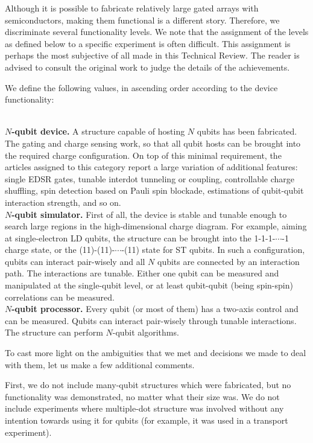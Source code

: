 \documentclass[aps, prx, showpacs, twocolumn, superscriptaddress, notitlepage, longbibliography, floatfix, nofootinbib]{revtex4-2}
\newcommand{\separate}[1]
{
 #1
}
\begin{document}
\label{sec:arrayFunctionality}

Although it is possible to fabricate relatively large gated arrays with semiconductors, making them functional is a different story. Therefore, we discriminate several functionality levels. We note that the assignment of the levels as defined below to a specific experiment is often difficult. This assignment is perhaps the most subjective of all made in this Technical Review. The reader is advised to consult the original work to judge the details of the achievements. 


We define the following values, in ascending order according to the device functionality:
\separate{
\textbf{\\$N$-qubit device.} A structure capable of hosting $N$ qubits has been fabricated. The gating and charge sensing work, so that all qubit hosts can be brought into the required charge configuration. On top of this minimal requirement, the articles assigned to this category report a large variation of additional features: single EDSR gates, tunable interdot tunneling or coupling, controllable charge shuffling, spin detection based on Pauli spin blockade, estimations of qubit-qubit interaction strength, and so on. 
\textbf{\\$N$-qubit simulator.} First of all, the device is stable and tunable enough to search large regions in the high-dimensional charge diagram. For example, aiming at single-electron LD qubits, the structure can be brought into the 1-1-1-$\cdots$-1 charge state, or the (11)-(11)-$\cdots$-(11) state for ST qubits. In such a configuration, qubits can interact pair-wisely and all $N$ qubits are connected by an interaction path. The interactions are tunable. Either one qubit can be measured and manipulated at the single-qubit level, or at least qubit-qubit (being spin-spin) correlations can be measured.
\textbf{\\$N$-qubit processor.} Every qubit (or most of them) has a two-axis control and can be measured. Qubits can interact pair-wisely through tunable interactions. The structure can perform $N$-qubit algorithms. 
}


To cast more light on the ambiguities that we met and decisions we made to deal with them, let us make a few additional comments.

First, we do not include many-qubit structures which were fabricated, but no functionality was demonstrated, no matter what their size was. We do not include experiments where multiple-dot structure was involved without any intention towards using it for qubits (for example, it was used in a transport experiment).
\end{document}
